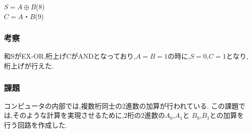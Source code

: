 \documentclass[twocolumn, 10pt,a4j]{jsarticle}
\begin{document}
    \begin{center}
      $S = A \oplus B$\quad(8) \\
      $C = A・B$\quad(9) \\  
    \end{center}
  \subsubsection{考察}
    和SがEX-OR,桁上げCがANDとなっており,$A=B=1$の時に,$S=0$,$C=1$となり,
    桁上げが行えた.
  \subsubsection{課題}
    コンピュータの内部では,複数桁同士の2進数の加算が行われている.
    この課題では,そのような計算を実現させるために,2桁の2進数の$A_{0}$,$A_{1}$と
    $B_{0}$,$B_{1}$との加算を行う回路を作成した.
\end{document}
